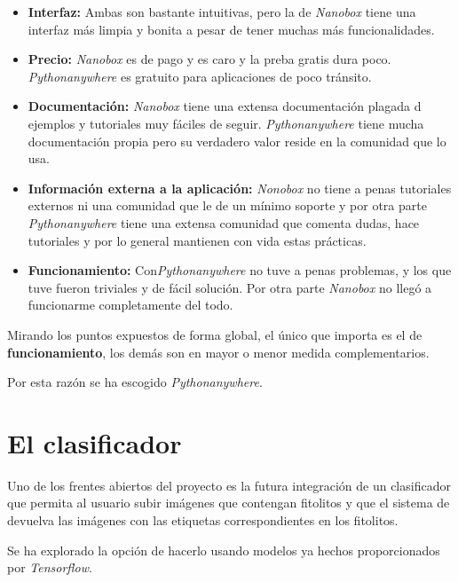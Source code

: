 \begin{itemize}
	\item \textbf{Interfaz:} Ambas son bastante intuitivas, pero la de \textit{Nanobox} tiene una interfaz más limpia y bonita a pesar de tener muchas más funcionalidades.
	
	\item \textbf{Precio:} \textit{Nanobox} es de pago y es caro y la preba gratis dura poco. \textit{Pythonanywhere} es gratuito para aplicaciones de poco tránsito.
	
	\item \textbf{Documentación:} \textit{Nanobox} tiene una extensa documentación plagada d ejemplos y tutoriales muy fáciles de seguir. \textit{Pythonanywhere} tiene mucha documentación propia pero su verdadero valor reside en la comunidad que lo usa.
	
	\item \textbf{Información externa a la aplicación:} \textit{Nonobox} no tiene a penas tutoriales externos ni una comunidad que le de un mínimo soporte y por otra parte \textit{Pythonanywhere} tiene una extensa comunidad que comenta dudas, hace tutoriales y por lo general mantienen con vida estas prácticas.
	
	\item \textbf{Funcionamiento:} Con\textit{Pythonanywhere} no tuve a penas problemas, y los que tuve fueron triviales y de fácil solución. Por otra parte \textit{Nanobox} no llegó a funcionarme completamente del todo.
	
\end{itemize}

Mirando los puntos expuestos de forma global, el único que importa es el de \textbf{funcionamiento}, los demás son en mayor o menor medida complementarios.

Por esta razón se ha escogido \textit{Pythonanywhere}.

\section{El clasificador}

Uno de los frentes abiertos del proyecto es la futura integración de un clasificador que permita al usuario subir imágenes que contengan fitolitos y que el sistema de devuelva las imágenes con las etiquetas correspondientes en los fitolitos.

Se ha explorado la opción de hacerlo usando modelos ya hechos proporcionados por \textit{Tensorflow}.


